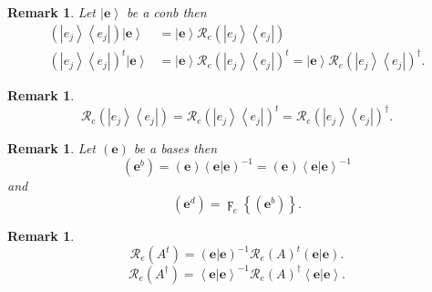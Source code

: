 \documentclass[aps,preprint]{revtex4}%
\newtheorem{remark}[theorem]{Remark}
\begin{document}
\begin{remark}
Let $\left\vert \mathbf{e}\right\rangle $ be a conb then
\begin{align}
\left(  \left\vert e_{j}\right\rangle \left\langle e_{j}\right\vert \right)
\left\vert \mathbf{e}\right\rangle  &  =\left\vert \mathbf{e}\right\rangle
\mathcal{R}_{e}\left(  \left\vert e_{j}\right\rangle \left\langle
e_{j}\right\vert \right) \\
\left(  \left\vert e_{j}\right\rangle \left\langle e_{j}\right\vert \right)
^{t}\left\vert \mathbf{e}\right\rangle  &  =\left\vert \mathbf{e}\right\rangle
\mathcal{R}_{e}\left(  \left\vert e_{j}\right\rangle \left\langle
e_{j}\right\vert \right)  ^{t}=\left\vert \mathbf{e}\right\rangle
\mathcal{R}_{e}\left(  \left\vert e_{j}\right\rangle \left\langle
e_{j}\right\vert \right)  ^{\dagger}.
\end{align}

\end{remark}

\begin{remark}%
\begin{equation}
\mathcal{R}_{e}\left(  \left\vert e_{j}\right\rangle \left\langle
e_{j}\right\vert \right)  =\mathcal{R}_{e}\left(  \left\vert e_{j}%
\right\rangle \left\langle e_{j}\right\vert \right)  ^{t}=\mathcal{R}%
_{e}\left(  \left\vert e_{j}\right\rangle \left\langle e_{j}\right\vert
\right)  ^{\dagger}.
\end{equation}

\end{remark}

\begin{remark}
Let $\left(  \mathbf{e}\right)  $ be a bases then%
\begin{equation}
\left(  \mathbf{e}^{b}\right)  =\left(  \mathbf{e}\right)  \left(  \left.
\mathbf{e}\right\vert \mathbf{e}\right)  ^{-1}=\left(  \mathbf{e}\right)
\left\langle \left.  \mathbf{e}\right\vert \mathbf{e}\right\rangle ^{-1}%
\end{equation}
and
\begin{equation}
\left(  \mathbf{e}^{d}\right)  =\digamma_{e}\left\{  \left(  \mathbf{e}%
^{b}\right)  \right\}  .
\end{equation}

\end{remark}

\begin{remark}%
\begin{equation}
\mathcal{R}_{e}\left(  A^{t}\right)  =\left(  \left.  \mathbf{e}\right\vert
\mathbf{e}\right)  ^{-1}\mathcal{R}_{e}\left(  A\right)  ^{t}\left(  \left.
\mathbf{e}\right\vert \mathbf{e}\right)  .
\end{equation}%
\begin{equation}
\mathcal{R}_{e}\left(  A^{\dagger}\right)  =\left\langle \left.
\mathbf{e}\right\vert \mathbf{e}\right\rangle ^{-1}\mathcal{R}_{e}\left(
A\right)  ^{\dagger}\left\langle \left.  \mathbf{e}\right\vert \mathbf{e}%
\right\rangle .
\end{equation}

\end{remark}
\end{document}
